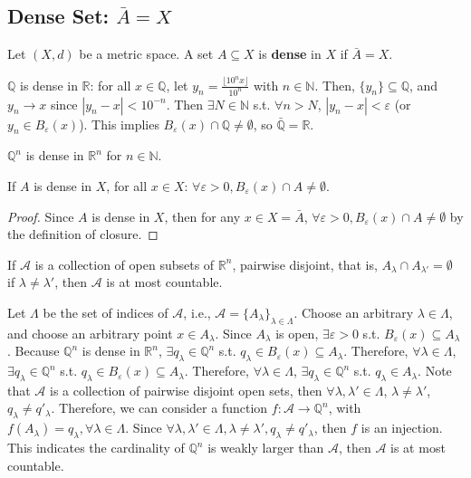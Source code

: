 \documentclass[11pt]{elegantbook}
\begin{document}
\subsection{Dense Set: $\bar{A}=X$}
\begin{definition}
    \normalfont
    Let $(X,d)$ be a metric space. A set $A\subseteq X$ is \textbf{dense} in $X$ if $\bar{A}=X$.
\end{definition}
\begin{example}
    $\mathbb{Q}$ is dense in $\mathbb{R}$: for all $x\in \mathbb{Q}$, let $y_n=\frac{\lfloor 10^nx\rfloor}{10^n}$ with $n\in \mathbb{N}$. Then, $\{y_n\}\subseteq \mathbb{Q}$, and $y_n \rightarrow x$ since $|y_n-x|<10^{-n}$. Then $\exists N\in \mathbb{N}$ s.t. $\forall n> N$, $|y_n-x|<\varepsilon$ (or $y_n\in B_{\varepsilon}(x)$). This implies $B_\varepsilon(x)\cap \mathbb{Q}\neq \emptyset$, so $\bar{\mathbb{Q}}=\mathbb{R}$.
\end{example}
\begin{corollary}
    $\mathbb{Q}^n$ is dense in $\mathbb{R}^n$ for $n\in \mathbb{N}$.
\end{corollary}

\begin{theorem}
    If $A$ is dense in $X$, for all $x\in X$: $\forall \varepsilon>0, B_\varepsilon(x)\cap A\neq \emptyset$.
\end{theorem}
\begin{proof}
    Since $A$ is dense in $X$, then for any $x\in X=\bar{A}$, $\forall \varepsilon>0, B_\varepsilon(x)\cap A\neq \emptyset$ by the definition of closure.
\end{proof}

\begin{example}
    If $\mathcal{A}$ is a collection of open subsets of $\mathbb{R}^n$, pairwise disjoint, that is, $A_\lambda \cap A_{\lambda'} = \emptyset$ if $\lambda\neq\lambda'$, then $\mathcal{A}$ is at most countable.
\end{example}
Let $\Lambda$ be the set of indices of $\mathcal{A}$, i.e., $\mathcal{A}=\{A_\lambda\}_{\lambda\in\Lambda}$. Choose an arbitrary $\lambda\in\Lambda$, and choose an arbitrary point $x\in A_\lambda$. Since $A_\lambda$ is open, $\exists \varepsilon>0$ s.t. $B_\varepsilon(x)\subseteq A_\lambda$. Because $\mathbb{Q}^n$ is dense in $\mathbb{R}^n$, $\exists q_\lambda\in \mathbb{Q}^n$ s.t. $q_\lambda\in B_\varepsilon(x)\subseteq A_\lambda$. Therefore, $\forall \lambda\in\Lambda$, $\exists q_\lambda\in \mathbb{Q}^n$ s.t. $q_\lambda\in B_\varepsilon(x)\subseteq A_\lambda$. Therefore, $\forall \lambda\in \Lambda$, $\exists q_\lambda\in \mathbb{Q}^n$ s.t. $q_\lambda\in A_\lambda$. Note that $\mathcal{A}$ is a collection of pairwise disjoint open sets, then $\forall \lambda,\lambda'\in\Lambda$, $\lambda\neq\lambda'$, $q_\lambda\neq q'_\lambda$. Therefore, we can consider a function $f: \mathcal{A} \rightarrow \mathbb{Q}^n$, with $f(A_\lambda)=q_\lambda, \forall \lambda\in\Lambda$. Since $\forall \lambda,\lambda'\in\Lambda, \lambda\neq\lambda',q_\lambda\neq q'_\lambda$, then $f$ is an injection. This indicates the cardinality of $\mathbb{Q}^n$ is weakly larger than $\mathcal{A}$, then $\mathcal{A}$ is at most countable.
\end{document}
